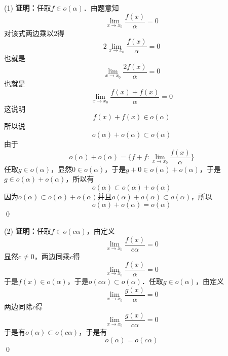 (1) \textbf{证明：}任取$f \in o(\alpha)$．由题意知
\begin{equation}
    \lim_{x \to x_0} \frac{f(x)}{\alpha} = 0
\end{equation}
对该式两边乘以$2$得
\begin{equation}
    2\lim_{x \to x_0} \frac{f(x)}{\alpha} = 0
\end{equation}
也就是
\begin{equation}
    \lim_{x \to x_0} \frac{2f(x)}{\alpha} = 0
\end{equation}
也就是
\begin{equation}
    \lim_{x \to x_0} \frac{f(x) + f(x)}{\alpha} = 0
\end{equation}
这说明
\begin{equation}
    f(x) + f(x) \in o(\alpha)
\end{equation}
所以说
\begin{equation}
    o(\alpha) + o(\alpha) \subset o(\alpha)
\end{equation}
由于
\begin{equation}
    o(\alpha) + o(\alpha) = \{ f+f: \lim_{x \to x_0} \displaystyle\frac{f(x)}{\alpha} \}
\end{equation}
任取$g \in o(\alpha)$，显然$0 \in o(\alpha)$，于是$g + 0 \in o(\alpha) + o(\alpha)$，于是$g \in o(\alpha) + o(\alpha)$，所以有
\begin{equation}
    o(\alpha) \subset o(\alpha) + o(\alpha)
\end{equation}
因为$o(\alpha) \subset o(\alpha) + o(\alpha)$并且$o(\alpha) + o(\alpha) \subset o(\alpha)$，所以
\begin{equation}
    o(\alpha) + o(\alpha) = o(\alpha)
\end{equation}
\qed

(2) \textbf{证明：}任取$f \in o(c\alpha)$，由定义
\begin{equation}
    \lim_{x \to x_0} \frac{f(x)}{c \alpha} = 0
\end{equation}
显然$c \neq 0$，两边同乘$c$得
\begin{equation}
    \lim_{x \to x_0} \frac{f(x)}{\alpha} = 0
\end{equation}
于是$f(x) \in o(\alpha)$，于是$o(c\alpha) \subset o(\alpha)$．任取$g \in o(\alpha)$，由定义
\begin{equation}
    \lim_{x \to x_0} \frac{g(x)}{\alpha} = 0
\end{equation}
两边同除$c$得
\begin{equation}
    \lim_{x \to x_0} \frac{g(x)}{c \alpha} = 0
\end{equation}
于是有$o(\alpha) \subset o(c\alpha)$，于是有
\begin{equation}
    o(\alpha) = o(c\alpha)
\end{equation}
\qed

